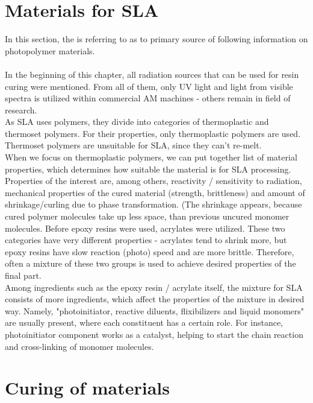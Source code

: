 \documentclass[a4paper, twoside, 11pt]{report}
\begin{document}
\section{Materials for SLA}
In this section, the \cite{AMT} is referring to \cite{SLAmaterials} as to primary source of following information on photopolymer materials.\\
\\
In the beginning of this chapter, all radiation sources that can be used for resin curing were mentioned. From all of them, only UV light and light from visible spectra is utilized within commercial AM machines - others remain in field of research.\\
As SLA uses polymers, they divide into categories of thermoplastic and thermoset polymers. For their properties, only thermoplastic polymers are used. Thermoset polymers are unsuitable for SLA, since they can't re-melt.\\
When we focus on thermoplastic polymers, we can put together list of material properties, which determines how suitable the material is for SLA processing. Properties of the interest are, among others, reactivity / sensitivity to radiation, mechanical properties of the cured material (strength, brittleness) and amount of shrinkage/curling due to phase transformation. (The shrinkage appears, because cured polymer molecules take up less space, than previous uncured monomer molecules.  Before epoxy resins were used, acrylates were utilized. These two categories have very different properties - acrylates tend to shrink more, but epoxy resins have slow reaction (photo) speed and are more brittle. Therefore, often a mixture of these two groups is used to achieve desired properties of the final part.\\
Among ingredients such as the epoxy resin / acrylate itself, the mixture for SLA consists of more ingredients, which affect the properties of the mixture in desired way. Namely, "photoinitiator, reactive diluents, flixibilizers and liquid monomers" \cite[p. ~67]{AMT} are usually present, where each constituent has a certain role. For instance, photoinitiator component works as a catalyst, helping to start the chain reaction and cross-linking of monomer molecules.
%
%
%
\section{Curing of materials}
%
\end{document}
